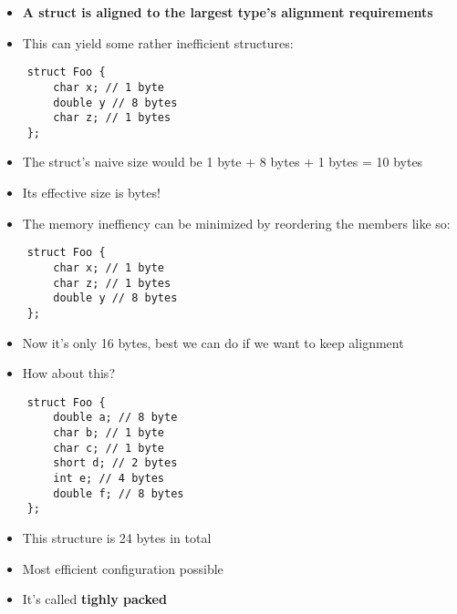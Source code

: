 \documentclass{beamer}
\begin{document}
\begin{frame}[fragile]{\insertsection}{\insertsubsection}
    \begin{itemize}
        \item \textbf{A struct is aligned to the largest type's alignment requirements}\pause
        \item This can yield some rather inefficient structures:
    \end{itemize}
    \begin{verbatim}
    struct Foo {
        char x; // 1 byte
        double y // 8 bytes
        char z; // 1 bytes
    };
    \end{verbatim}
    \begin{itemize}
        \item The struct's naive size would be 1 byte + 8 bytes + 1 bytes = 10 bytes\pause
        \item Its effective size is  bytes!
    \end{itemize}
\end{frame}

\begin{frame}[fragile]{\insertsection}{\insertsubsection}
    \begin{itemize}
        \item The memory ineffiency can be minimized by reordering the members like so:
    \end{itemize}
    \begin{verbatim}
    struct Foo {
        char x; // 1 byte
        char z; // 1 bytes
        double y // 8 bytes
    };
    \end{verbatim}
    \begin{itemize}
        \item Now it's only 16 bytes, best we can do if we want to keep alignment
    \end{itemize}
\end{frame}

\begin{frame}[fragile]{\insertsection}{\insertsubsection}
    \begin{itemize}
        \item How about this?
    \end{itemize}
    \begin{verbatim}
    struct Foo {
        double a; // 8 byte
        char b; // 1 byte
        char c; // 1 byte
        short d; // 2 bytes
        int e; // 4 bytes
        double f; // 8 bytes
    };
    \end{verbatim}
    \pause
    \begin{itemize}
        \item This structure is 24 bytes in total
        \item Most efficient configuration possible
        \item It's called \textbf{tighly packed}
    \end{itemize}
\end{frame}
\end{document}
